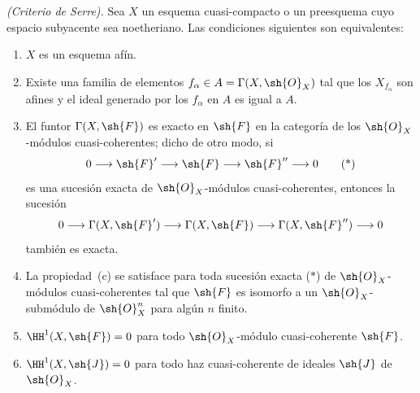 \documentclass[oneside,10pt]{amsart}
\makeatletter
\newcommand{\ega@arrow}[2]{\mathchoice{#1}{#2}{#2}{#2}}
\renewcommand{\to}{\ega@arrow{\longrightarrow}{\rightarrow}}
\let\EGAOriginalLabel\label
\renewcommand{\label}[1]{\phantomsection\EGAOriginalLabel{#1}}
\makeatother
\begin{document}
\begin{theorem}[5.2.1]
\label{II.5.2.1}
\emph{(Criterio de Serre).}
Sea $X$ un esquema cuasi-compacto o un preesquema cuyo espacio subyacente sea noetheriano.
Las condiciones siguientes son equivalentes:
\begin{enumerate}
  \item[{\rm(a)}] $X$ es un esquema afín.
  \item[{\rm(b)}] Existe una familia de elementos $f_\alpha\in A=\Gamma(X,\sh{O}_X)$ tal que los $X_{f_\alpha}$ son afines y el ideal generado por los $f_\alpha$ en $A$ es igual a $A$.
  \item[{\rm(c)}] El funtor $\Gamma(X,\sh{F})$ es exacto en $\sh{F}$ en la categoría de los $\sh{O}_X$-módulos cuasi-coherentes; dicho de otro modo, si
    \[
      0\to\sh{F}'\to\sh{F}\to\sh{F}''\to0
      \tag{*}
    \]
    es una sucesión exacta de $\sh{O}_X$-módulos cuasi-coherentes, entonces la sucesión
    \[
      0\to\Gamma(X,\sh{F}')\to\Gamma(X,\sh{F})\to\Gamma(X,\sh{F}'')\to0
    \]
    también es exacta.
  \item[{\rm(c')}] La propiedad~{\rm(c)} se satisface para toda sucesión exacta {\rm($*$)} de $\sh{O}_X$-módulos cuasi-coherentes tal que $\sh{F}$ es isomorfo a un $\sh{O}_X$-submódulo de $\sh{O}_X^n$ para algún $n$ finito.
  \item[{\rm(d)}] $\HH^1(X,\sh{F})=0$ para todo $\sh{O}_X$-módulo cuasi-coherente $\sh{F}$.
  \item[{\rm(d$'$)}] $\HH^1(X,\sh{J})=0$ para todo haz cuasi-coherente de ideales $\sh{J}$ de $\sh{O}_X$.
\end{enumerate}
\end{theorem}
\end{document}
